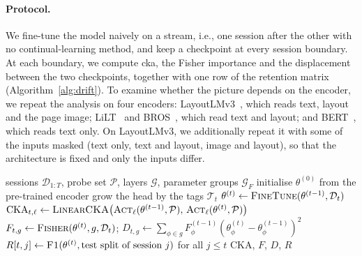 \paragraph{Protocol.} We fine-tune the model naively on a stream, i.e., one session after the
other with no continual-learning method, and keep a checkpoint at every session boundary.
At each boundary, we compute \gls{cka}, the Fisher importance and the displacement between
the two checkpoints, together with one row of the retention matrix
(Algorithm~\ref{alg:drift}). To examine whether the picture depends on the encoder, we repeat
the analysis on four encoders: LayoutLMv3~\citep{huang2022layoutlmv3}, which reads text,
layout and the page image; LiLT~\citep{wang2022lilt} and BROS~\citep{hong2022bros}, which
read text and layout; and BERT~\citep{devlin2019bert}, which reads text only. On LayoutLMv3,
we additionally repeat it with some of the inputs masked (text only, text and layout, image
and layout), so that the architecture is fixed and only the inputs differ.

\begin{algorithm}[!htbp]
  \caption{Drift analysis at the session boundaries}
  \label{alg:drift}
  \begin{algorithmic}[1]
    \Require sessions $\mathcal{D}_{1:T}$, probe set $\mathcal{P}$, layers $\mathcal{G}$, parameter groups $\mathcal{G}_F$
    \State initialise $\theta^{(0)}$ from the pre-trained encoder
      \State grow the head by the tags $\mathcal{T}_t$
      \State $\theta^{(t)}\gets\textsc{FineTune}(\theta^{(t-1)},\mathcal{D}_t)$ 
        \State $\mathrm{CKA}_{t,\ell}\gets\textsc{LinearCKA}\big(\textsc{Act}_\ell(\theta^{(t-1)},\mathcal{P}),\,\textsc{Act}_\ell(\theta^{(t)},\mathcal{P})\big)$
      \EndFor
        \State $F_{t,g}\gets\textsc{Fisher}(\theta^{(t)},g,\mathcal{D}_t)$;\quad
               $D_{t,g}\gets\sum_{\phi\in g}F^{(t-1)}_{\phi}(\theta^{(t)}_{\phi}-\theta^{(t-1)}_{\phi})^{2}$
      \EndFor
      \State $R[t,j]\gets\textsc{F1}(\theta^{(t)},\text{test split of session } j)$ for all $j\le t$
    \EndFor
    \State \Return $\mathrm{CKA}$, $F$, $D$, $R$
  \end{algorithmic}
\end{algorithm}

